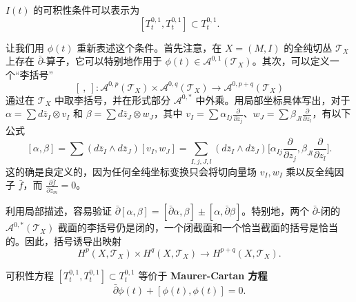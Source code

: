 $I(t)$ 的可积性条件可以表示为\[
    [T^{0,1}_t,T^{0,1}_t]\subset T^{0,1}_t.
\]

让我们用 $\phi(t)$ 重新表述这个条件。首先注意，在 $X=(M,I)$ 的全纯切丛 $\mathcal{T}_X$ 上存在 $\bar{\partial}$-算子，它可以特别地作用于 $\phi(t)\in \mathcal{A}^{0,1}(\mathcal{T}_X)$。其次，可以定义一个“李括号”\[
    [\ ,\ ]:\mathcal{A}^{0,p}(\mathcal{T}_X)\times \mathcal{A}^{0,q}(\mathcal{T}_X)\longrightarrow \mathcal{A}^{0,p+q}(\mathcal{T}_X)
\]通过在 $\mathcal{T}_X$ 中取李括号，并在形式部分 $\mathcal{A}^{0,*}$ 中外乘。用局部坐标具体写出，对于 $\alpha=\sum d\bar{z}_I\otimes v_I$ 和 $\beta=\sum d\bar{z}_J\otimes w_J$，其中 $v_I=\sum \alpha_{Ij}\frac{\partial}{\partial z_j}$、$w_J=\sum \beta_{Jl}\frac{\partial}{\partial z_l}$，有以下公式\[
    [\alpha,\beta]=\sum (d\bar{z}_I \wedge d\bar{z}_J)[v_I , w_J]=\sum_{I,j,J,l}(d\bar{z}_I \wedge d\bar{z}_J)\big[\alpha_{Ij}\frac{\partial}{\partial z_j},\beta_{Jl}\frac{\partial}{\partial z_{l}}\big].
\]这的确是良定义的，因为任何全纯坐标变换只会将切向量场 $v_I,w_I$ 乘以反全纯因子 $\bar{f}$，而 $\frac{\partial\bar{f}}{\partial z_m}=0$。

\begin{remark}\label{cvb}
    利用局部描述，容易验证 $\bar{\partial}[\alpha,\beta]=[\bar{\partial}\alpha,\beta]\pm[\alpha,\bar{\partial}\beta]$。特别地，两个 $\bar{\partial}$-闭的 $\mathcal{A}^{0,*}(\mathcal{T}_X)$ 截面的李括号仍是闭的，一个闭截面和一个恰当截面的括号是恰当的。因此，括号诱导出映射\[
        H^p(X,\mathcal{T}_X)\times H^q(X,\mathcal{T}_X)\longrightarrow H^{p+q}(X,\mathcal{T}_X).
    \]
\end{remark}

\begin{lemma}
    可积性方程 $[T^{0,1}_t,T^{0,1}_t]\subset T^{0,1}_t$ 等价于 \textbf{Maurer-Cartan 方程}\begin{equation}\label{wer}
        \bar{\partial}\phi(t)+[\phi(t),\phi(t)]=0.
    \end{equation}
\end{lemma}

